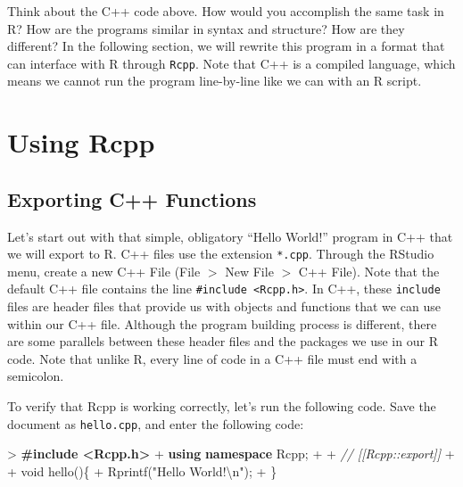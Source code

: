 \documentclass[
]{krantz}
\makeatletter
\newenvironment{Shaded}{\begin{snugshade}}{\end{snugshade}}
\newcommand{\CommentTok}[1]{\textcolor[rgb]{0.37,0.37,0.37}{\textit{#1}}}
\newcommand{\DataTypeTok}[1]{\textcolor[rgb]{0.27,0.27,0.27}{#1}}
\newcommand{\ErrorTok}[1]{\textcolor[rgb]{0.14,0.14,0.14}{\textbf{#1}}}
\newcommand{\KeywordTok}[1]{\textcolor[rgb]{0.27,0.27,0.27}{\textbf{#1}}}
\newcommand{\NormalTok}[1]{#1}
\newcommand{\SpecialCharTok}[1]{\textcolor[rgb]{0,0,0}{#1}}
\newcommand{\StringTok}[1]{\textcolor[rgb]{0.5,0.5,0.5}{#1}}
\newenvironment{kframe}{%
\medskip{}
\setlength{\fboxsep}{.8em}
 \def\at@end@of@kframe{}%
 \ifinner\ifhmode%
  \def\at@end@of@kframe{\end{minipage}}%
  \begin{minipage}{\columnwidth}%
 \fi\fi%
 \def\FrameCommand##1{\hskip\@totalleftmargin \hskip-\fboxsep
 \colorbox{shadecolor}{##1}\hskip-\fboxsep
     \hskip-\linewidth \hskip-\@totalleftmargin \hskip\columnwidth}%
 \MakeFramed {\advance\hsize-\width
   \@totalleftmargin\z@ \linewidth\hsize
   \@setminipage}}%
 {\par\unskip\endMakeFramed%
 \at@end@of@kframe}
\renewenvironment{Shaded}{\begin{kframe}}{\end{kframe}}
\makeatother
\begin{document}
Think about the C++ code above. How would you accomplish the same task in R? How are the programs similar in syntax and structure? How are they different? In the following section, we will rewrite this program in a format that can interface with R through \texttt{Rcpp}. Note that C++ is a compiled language, which means we cannot run the program line-by-line like we can with an R script.

\hypertarget{using-rcpp}{%
\section{Using Rcpp}\label{using-rcpp}}

\hypertarget{exporting-c-functions}{%
\subsection{Exporting C++ Functions}\label{exporting-c-functions}}

Let's start out with that simple, obligatory ``Hello World!'' program in C++ that we will export to R. C++ files use the extension \texttt{*.cpp}. Through the RStudio menu, create a new C++ File (File \(>\) New File \(>\) C++ File). Note that the default C++ file contains the line \texttt{\#include\ \textless{}Rcpp.h\textgreater{}}. In C++, these \texttt{include} files are header files that provide us with objects and functions that we can use within our C++ file. Although the program building process is different, there are some parallels between these header files and the packages we use in our R code. Note that unlike R, every line of code in a C++ file must end with a semicolon.

To verify that Rcpp is working correctly, let's run the following code. Save the document as \texttt{hello.cpp}, and enter the following code:

\begin{Shaded}
\begin{Highlighting}[]
\NormalTok{\textgreater{} }\ErrorTok{\#include \textless{}Rcpp.h\textgreater{}}
\NormalTok{+ }\KeywordTok{using} \KeywordTok{namespace}\NormalTok{ Rcpp;}
\NormalTok{+ }
\NormalTok{+ }\CommentTok{// [[Rcpp::export]]}
\NormalTok{+ }
\NormalTok{+ }\DataTypeTok{void}\NormalTok{ hello()\{}
\NormalTok{+   Rprintf(}\StringTok{"Hello World!}\SpecialCharTok{\textbackslash{}n}\StringTok{"}\NormalTok{);}
\NormalTok{+ \}}
\end{Highlighting}
\end{Shaded}
\end{document}
